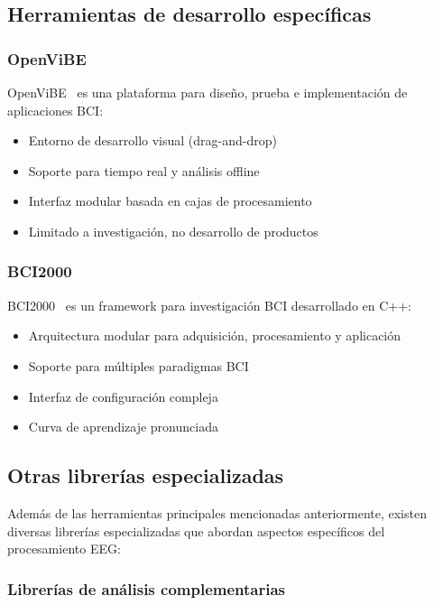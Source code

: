 \subsection{Herramientas de desarrollo específicas}
\label{subsec:herramientas_desarrollo}

\subsubsection{OpenViBE}
OpenViBE~\cite{openvibe} es una plataforma para diseño, prueba e implementación de aplicaciones BCI:
\begin{itemize}
    \item Entorno de desarrollo visual (drag-and-drop)
    \item Soporte para tiempo real y análisis offline
    \item Interfaz modular basada en cajas de procesamiento
    \item Limitado a investigación, no desarrollo de productos
\end{itemize}

\subsubsection{BCI2000}
BCI2000~\cite{bci2000} es un framework para investigación BCI desarrollado en C++:
\begin{itemize}
    \item Arquitectura modular para adquisición, procesamiento y aplicación
    \item Soporte para múltiples paradigmas BCI
    \item Interfaz de configuración compleja
    \item Curva de aprendizaje pronunciada
\end{itemize}

\subsection{Otras librerías especializadas}
\label{subsec:analisis_librerias}

Además de las herramientas principales mencionadas anteriormente, existen diversas librerías especializadas que abordan aspectos específicos del procesamiento EEG:

\subsubsection{Librerías de análisis complementarias}

